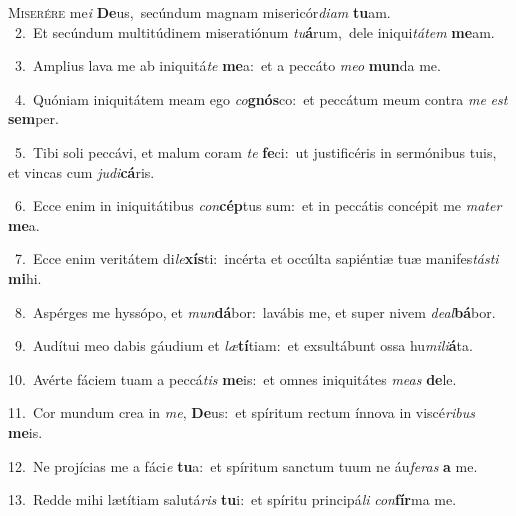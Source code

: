 \lettrine{\initial\textcolor{\initialcolor}{M}}{iserére} me\textit{i} \textbf{De}\-us,~\star secúndum magnam misericór\-\textit{di}\-\textit{am} \textbf{tu}\-am.\\
{\numbfont\textcolor{\numbcolor}{~2.}}~Et secúndum multitúdinem miseratiónum \textit{tu}\-\textbf{á}rum,~\star dele iniqui\-\textit{tá}\-\textit{tem} \textbf{me}\-am.\par
{\numbfont\textcolor{\numbcolor}{~3.}}~Amplius lava me ab iniquitá\textit{te} \textbf{me}\-a:~\star et a peccáto \textit{me}\-\textit{o} \textbf{mun}\-da me.\par
{\numbfont\textcolor{\numbcolor}{~4.}}~Quóniam iniquitátem meam ego \textit{co}\-\textbf{gnós}co:~\star et peccátum meum contra \textit{me} \textit{est} \textbf{sem}\-per.\par
{\numbfont\textcolor{\numbcolor}{~5.}}~Tibi soli peccávi, et malum coram \textit{te} \textbf{fe}\-ci:~\star ut justificéris in sermónibus tuis, et vincas cum \textit{ju}\-\textit{di}\textbf{cá}ris.\par
{\numbfont\textcolor{\numbcolor}{~6.}}~Ecce enim in iniquitátibus \textit{con}\-\textbf{cép}tus sum:~\star et in peccátis concépit me \textit{ma}\-\textit{ter} \textbf{me}\-a.\par
{\numbfont\textcolor{\numbcolor}{~7.}}~Ecce enim veritátem di\-\textit{le}\-\textbf{xís}ti:~\star incérta et occúlta sapiéntiæ tuæ manifes\-\textit{tás}\-\textit{ti} \textbf{mi}\-hi.\par
{\numbfont\textcolor{\numbcolor}{~8.}}~Aspérges me hyssópo, et \textit{mun}\-\textbf{dá}bor:~\star lavábis me, et super nivem \textit{de}\-\textit{al}\textbf{bá}bor.\par
{\numbfont\textcolor{\numbcolor}{~9.}}~Audítui meo dabis gáudium et \textit{læ}\-\textbf{tí}tiam:~\star et exsultábunt ossa hu\-\textit{mi}\-\textit{li}\textbf{á}ta.\par
{\numbfont\textcolor{\numbcolor}{10.}}~Avérte fáciem tuam a peccá\textit{tis} \textbf{me}\-is:~\star et omnes iniquitátes \textit{me}\-\textit{as} \textbf{de}\-le.\par
{\numbfont\textcolor{\numbcolor}{11.}}~Cor mundum crea in \textit{me}\-, \textbf{De}\-us:~\star et spíritum rectum ínnova in viscé\-\textit{ri}\-\textit{bus} \textbf{me}\-is.\par
{\numbfont\textcolor{\numbcolor}{12.}}~Ne projícias me a fáci\textit{e} \textbf{tu}\-a:~\star et spíritum sanctum tuum ne áu\-\textit{fe}\-\textit{ras} \textbf{a} me.\par
{\numbfont\textcolor{\numbcolor}{13.}}~Redde mihi lætítiam salutá\textit{ris} \textbf{tu}\-i:~\star et spíritu principá\textit{li} \textit{con}\-\textbf{fír}ma me.\par
